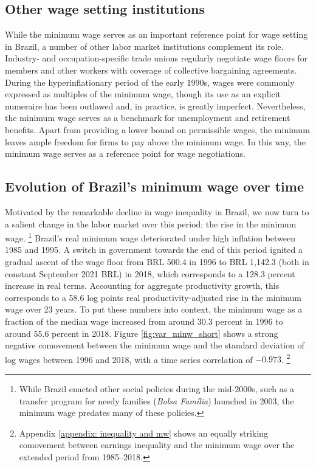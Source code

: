 \subsection{Other wage setting institutions}

While the minimum wage serves as an important reference point for wage setting in Brazil, a number of other labor market institutions complement its role. Industry- and occupation-specific trade unions regularly negotiate wage floors for members and other workers with coverage of collective bargaining agreements. During the hyperinflationary period of the early 1990s, wages were commonly expressed as multiples of the minimum wage, though its use as an explicit numeraire has been outlawed and, in practice, is greatly imperfect. Nevertheless, the minimum wage serves as a benchmark for unemployment and retirement benefits. Apart from providing a lower bound on permissible wages, the minimum leaves ample freedom for firms to pay above the minimum wage. In this way, the minimum wage serves as a reference point for wage negotiations.

\subsection{\label{subsec:The-minimum-wage}Evolution of Brazil's minimum wage over time}

Motivated by the remarkable decline in wage inequality in Brazil, we now turn to a
salient change in the labor market over this period: the rise in the
minimum wage.%
%
\footnote{While Brazil enacted other social policies during the mid-2000s, such as a transfer program for needy families (\emph{Bolsa Fam{\'{i}}lia}) launched in 2003, the minimum wage predates many of these policies.} %
%
Brazil's real minimum wage deteriorated under high inflation between 1985 and 1995. A switch in government towards the end of this period ignited a gradual ascent of the wage floor from BRL 500.4 in 1996 to BRL 1,142.3 (both in constant September 2021 BRL) in 2018, which corresponds to a 128.3 percent increase in real terms. Accounting for aggregate productivity growth, this corresponds to a 58.6 log points real productivity-adjusted rise in the minimum wage over 23 years. To put these numbers into context, the minimum wage as a fraction of the median wage increased from around 30.3 percent in 1996 to around 55.6 percent in 2018. Figure \ref{fig:var_minw_short} shows a strong negative comovement between the minimum wage and the standard deviation of log wages between 1996 and 2018, with a time series correlation of $-0.973$.%
%
\footnote{Appendix \ref{appendix: inequality and mw} shows an equally striking comovement between earnings inequality and the minimum wage over the extended period from 1985--2018.} %

